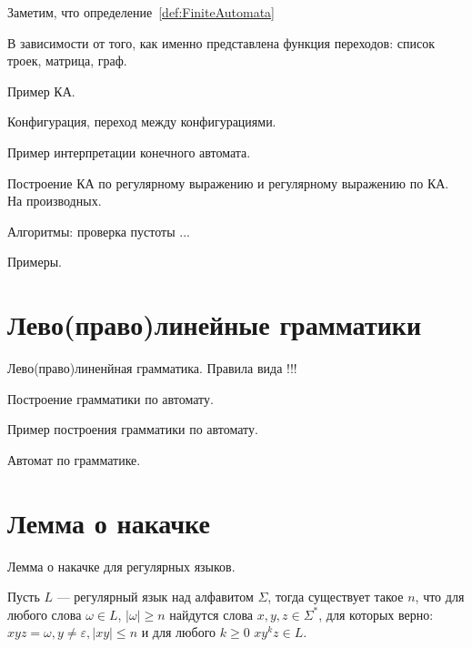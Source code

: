 Заметим, что определение~\ref{def:FiniteAutomata} 

В зависимости от того, как именно представлена функция переходов: список троек, матрица, граф.

\begin{example}
    Пример КА.    
    \begin{tikzpicture}
        
    \end{tikzpicture}
\end{example}


\begin{definition}
    Конфигурация, переход между конфигурациями.
\end{definition}

\begin{example}
Пример интерпретации конечного автомата.
\end{example}

Построение КА по регулярному выражению и регулярному выражению по КА. На производных.

Алгоритмы: проверка пустоты ... 

Примеры.


\section{Лево(право)линейные грамматики}

\begin{definition}
    Лево(право)линенйная грамматика. Правила вида  !!!
\end{definition}

Построение грамматики по автомату.

Пример построения грамматики по автомату.

Автомат по грамматике. 

\section{Лемма о накачке}

Лемма о накачке для регулярных языков.

\begin{lemma}
    Пусть $L$ --- регулярный язык над алфавитом $\Sigma$, тогда существует такое $n$, что для любого слова $\omega \in L$, $|\omega| \geq n$ найдутся слова $x,y,z\in \Sigma^*$, для которых верно: $xyz = \omega, y\neq \varepsilon,|xy|\leq n$ и для любого $k \geq 0$  $xy^kz \in L$.
\end{lemma}

